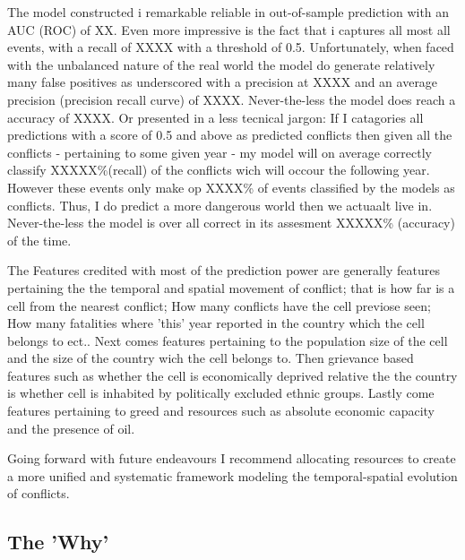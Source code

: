 \documentclass[a4paper]{article}
\begin{document}

The model constructed i remarkable reliable in out-of-sample prediction with an AUC (ROC) of XX. Even more impressive is the fact that i captures all most all events, with a recall of XXXX with a threshold of 0.5. Unfortunately, when faced with the unbalanced nature of the real world the model do generate relatively many false positives as underscored with a precision at XXXX and an average precision (precision recall curve) of XXXX. Never-the-less the model does reach a accuracy of XXXX. Or presented in a less tecnical jargon: If I catagories all predictions with a score of 0.5 and above as predicted conflicts then given all the conflicts - pertaining to some given year - my model will on average correctly classify XXXXX\%(recall) of the conflicts wich will occour the following year. However these events only make op XXXX\% of events classified by the models as conflicts. Thus, I do predict a more dangerous world then we actuaalt live in. Never-the-less the model is over all correct in its assesment XXXXX\% (accuracy) of the time.\par

The Features credited with most of the prediction power are generally features pertaining the the temporal and spatial movement of conflict; that is how far is a cell from the nearest conflict; How many conflicts have the cell previose seen; How many fatalities where 'this' year reported in the country which the cell belongs to ect.. Next comes features pertaining to the population size of the cell and the size of the country wich the cell belongs to. Then grievance based features such as whether the cell is economically deprived relative the the country is whether cell is inhabited by politically excluded ethnic groups. Lastly come features pertaining to greed and resources such as absolute economic capacity and the presence of oil.\par

Going forward with future endeavours I recommend allocating resources to create a more unified and systematic framework modeling the temporal-spatial evolution of conflicts.

\subsection{The 'Why'}
\end{document}
